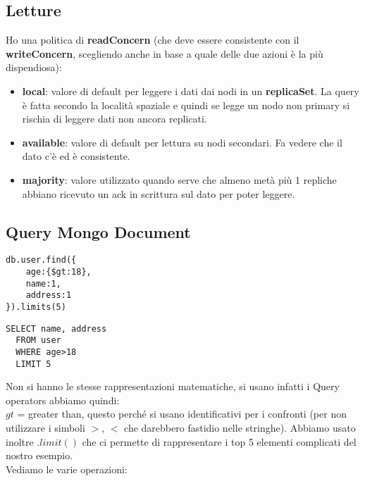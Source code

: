 \subsection{Letture}
Ho una politica di \textbf{readConcern} (che deve essere consistente con il \textbf{writeConcern}, scegliendo anche in base a quale delle due azioni è la più dispendiosa):
\begin{itemize}
    \item \textbf{local}: valore di default per leggere i dati dai nodi in un \textbf{replicaSet}. La query è fatta secondo la località spaziale e quindi se legge un nodo non primary si rischia di leggere dati non ancora replicati.
    \item \textbf{available}: valore di default per lettura su nodi secondari. Fa vedere che il dato c’è ed è consistente.
    \item \textbf{majority}: valore utilizzato quando serve che almeno metà più 1 repliche abbiano ricevuto un ack in scrittura sul dato per poter leggere.
\end{itemize}
\subsection{Query Mongo Document}
\begin{minipage}{.50\textwidth}
\begin{lstlisting}[caption = Scrittura in MongoDB]
db.user.find({
	age:{$gt:18},
	name:1,
	address:1
}).limits(5)
\end{lstlisting}
\end{minipage}\hfill
\begin{minipage}{.50\textwidth}
\begin{lstlisting}[caption = corrispettivo in SQL]
SELECT name, address
  FROM user
  WHERE age>18
  LIMIT 5
\end{lstlisting}
\end{minipage}

Non si hanno le stesse rappresentazioni matematiche, si usano infatti i Query operators abbiamo quindi:\\
$gt$ = greater than, questo perché si usano identificativi per i confronti (per non utilizzare i simboli $>$, $<$ che darebbero fastidio nelle stringhe). Abbiamo usato inoltre $.limit()$ che ci permette di rappresentare i top 5 elementi complicati del nostro esempio. \\
Vediamo le varie operazioni:


